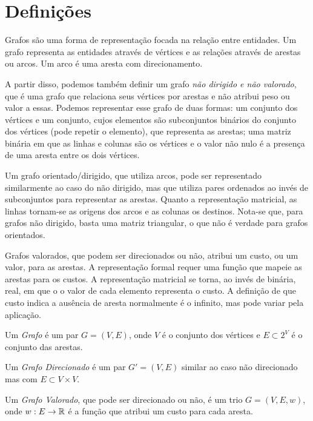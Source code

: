 
\section*{Definições}

Grafos são uma forma de representação focada na relação entre entidades. Um grafo representa as entidades através de vértices e as relações através de arestas ou arcos. Um arco é uma aresta com direcionamento.

A partir disso, podemos também definir um grafo \emph{não dirigido e não valorado}, que é uma grafo que relaciona seus vértices por arestas e não atribui peso ou valor a essas. Podemos representar esse grafo de duas formas: um conjunto dos vértices e um conjunto, cujos elementos são subconjuntos binários do conjunto dos vértices (pode repetir o elemento), que representa as arestas; uma matriz binária em que as linhas e colunas são os vértices e o valor não nulo é a presença de uma aresta entre os dois vértices.

Um grafo orientado/dirigido, que utiliza arcos, pode ser representado similarmente ao caso do não dirigido, mas que utiliza pares ordenados ao invés de subconjuntos para representar as arestas. Quanto a representação matricial, as linhas tornam-se as origens dos arcos e as colunas os destinos. Nota-se que, para grafos não dirigido, basta uma matriz triangular, o que não é verdade para grafos orientados.

Grafos valorados, que podem ser direcionados ou não, atribui um custo, ou um valor, para as arestas. A representação formal requer uma função que mapeie as arestas para os custos. A representação matricial se torna, ao invés de binária, real, em que o o valor de cada elemento representa o custo. A definição de que custo indica a ausência de aresta normalmente é o infinito, mas pode variar pela aplicação.

\begin{definition}
    Um \emph{Grafo} é um par $G=\left( V,E \right) $, onde  $V$ é o conjunto dos vértices e $E \subset 2^{V} $ é o conjunto das arestas.

    Um \emph{Grafo Direcionado} é um par $G'=\left( V,E \right) $ similar ao caso não direcionado mas com $E \subset V\times V$.

    Um \emph{Grafo Valorado}, que pode ser direcionado ou não, é um trio $G=\left( V, E, w \right) $, onde $w:E\to \mathbb{R}$ é a função que atribui um custo para cada aresta.
\end{definition}

